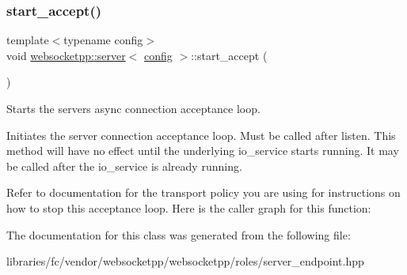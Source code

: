 \subsubsection{\texorpdfstring{start\+\_\+accept()}{start\_accept()}\hspace{0.1cm}{\footnotesize\ttfamily [2/2]}}
{\footnotesize\ttfamily template$<$typename config$>$ \\
void \mbox{\hyperlink{classwebsocketpp_1_1server}{websocketpp\+::server}}$<$ \mbox{\hyperlink{classconfig}{config}} $>$\+::start\+\_\+accept (\begin{DoxyParamCaption}{ }\end{DoxyParamCaption})\hspace{0.3cm}{\ttfamily [inline]}}



Starts the server\textquotesingle{}s async connection acceptance loop. 

Initiates the server connection acceptance loop. Must be called after listen. This method will have no effect until the underlying io\+\_\+service starts running. It may be called after the io\+\_\+service is already running.

Refer to documentation for the transport policy you are using for instructions on how to stop this acceptance loop. Here is the caller graph for this function\+:


The documentation for this class was generated from the following file\+:\begin{DoxyCompactItemize}
\item 
libraries/fc/vendor/websocketpp/websocketpp/roles/server\+\_\+endpoint.\+hpp\end{DoxyCompactItemize}
